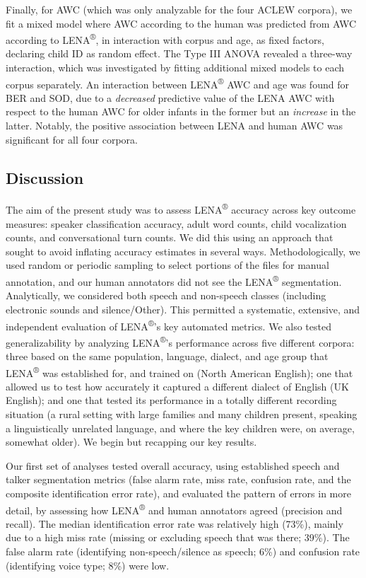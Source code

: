 \documentclass[english,table,man,floatsintext]{apa6}
\begin{document}
Finally, for AWC (which was only analyzable for the four ACLEW corpora), we fit a mixed model where AWC according to the human was predicted from AWC according to LENA\textsuperscript{®}, in interaction with corpus and age, as fixed factors, declaring child ID as random effect. The Type III ANOVA revealed a three-way interaction, which was investigated by fitting additional mixed models to each corpus separately. An interaction between LENA\textsuperscript{®} AWC and age was found for BER and SOD, due to a \emph{decreased} predictive value of the LENA AWC with respect to the human AWC for older infants in the former but an \emph{increase} in the latter. Notably, the positive association between LENA and human AWC was significant for all four corpora.

\hypertarget{discussion}{%
\subsection{Discussion}\label{discussion}}

The aim of the present study was to assess LENA\textsuperscript{®} accuracy across key outcome measures: speaker classification accuracy, adult word counts, child vocalization counts, and conversational turn counts. We did this using an approach that sought to avoid inflating accuracy estimates in several ways. Methodologically, we used random or periodic sampling to select portions of the files for manual annotation, and our human annotators did not see the LENA\textsuperscript{®} segmentation. Analytically, we considered both speech and non-speech classes (including electronic sounds and silence/Other). This permitted a systematic, extensive, and independent evaluation of LENA\textsuperscript{®}'s key automated metrics. We also tested generalizability by analyzing LENA\textsuperscript{®}'s performance across five different corpora: three based on the same population, language, dialect, and age group that LENA\textsuperscript{®} was established for, and trained on (North American English); one that allowed us to test how accurately it captured a different dialect of English (UK English); and one that tested its performance in a totally different recording situation (a rural setting with large families and many children present, speaking a linguistically unrelated language, and where the key children were, on average, somewhat older). We begin but recapping our key results.

Our first set of analyses tested overall accuracy, using established speech and talker segmentation metrics (false alarm rate, miss rate, confusion rate, and the composite identification error rate), and evaluated the pattern of errors in more detail, by assessing how LENA\textsuperscript{®} and human annotators agreed (precision and recall). The median identification error rate was relatively high (73\%), mainly due to a high miss rate (missing or excluding speech that was there; 39\%). The false alarm rate (identifying non-speech/silence as speech; 6\%) and confusion rate (identifying voice type; 8\%) were low.
\end{document}
